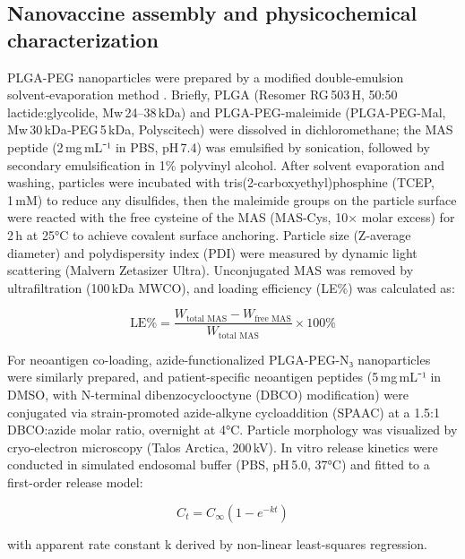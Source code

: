 \documentclass{article}
\begin{document}
\subsection{Nanovaccine assembly and physicochemical characterization}
PLGA-PEG nanoparticles were prepared by a modified double‑emulsion solvent‑evaporation method \cite{Danhier2012}. Briefly, PLGA (Resomer RG 503 H, 50:50 lactide:glycolide, Mw 24–38 kDa) and PLGA-PEG-maleimide (PLGA-PEG-Mal, Mw 30 kDa‑PEG 5 kDa, Polyscitech) were dissolved in dichloromethane; the MAS peptide (2 mg mL⁻¹ in PBS, pH 7.4) was emulsified by sonication, followed by secondary emulsification in 1\% polyvinyl alcohol. After solvent evaporation and washing, particles were incubated with tris(2-carboxyethyl)phosphine (TCEP, 1 mM) to reduce any disulfides, then the maleimide groups on the particle surface were reacted with the free cysteine of the MAS (MAS-Cys, 10× molar excess) for 2 h at 25°C to achieve covalent surface anchoring. Particle size (Z-average diameter) and polydispersity index (PDI) were measured by dynamic light scattering (Malvern Zetasizer Ultra). Unconjugated MAS was removed by ultrafiltration (100 kDa MWCO), and loading efficiency (LE\%) was calculated as:

\[
\text{LE\%} = \frac{W_{\text{total MAS}} - W_{\text{free MAS}}}{W_{\text{total MAS}}} \times 100\%
\]

For neoantigen co-loading, azide-functionalized PLGA-PEG-N₃ nanoparticles were similarly prepared, and patient-specific neoantigen peptides (5 mg mL⁻¹ in DMSO, with N-terminal dibenzocyclooctyne (DBCO) modification) were conjugated via strain-promoted azide‑alkyne cycloaddition (SPAAC) at a 1.5:1 DBCO:azide molar ratio, overnight at 4°C. Particle morphology was visualized by cryo-electron microscopy (Talos Arctica, 200 kV). In vitro release kinetics were conducted in simulated endosomal buffer (PBS, pH 5.0, 37°C) and fitted to a first-order release model:

\[
C_t = C_{\infty} (1 - e^{-kt})
\]

with apparent rate constant k derived by non-linear least-squares regression.
\end{document}
